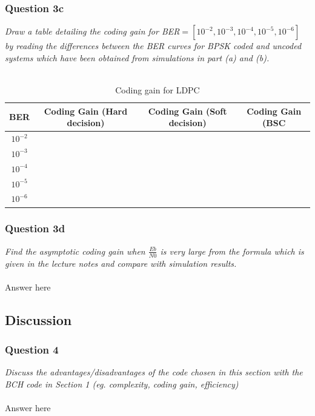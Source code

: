 \documentclass[a4paper]{article}
\begin{document}
\subsubsection{Question 3c} \textit{Draw a table detailing the coding gain for BER$= [10^{-2}, 10^{-3}, 10^{-4} , 10^{-5} , 10^{-6} ]$ by reading the differences between the BER curves for BPSK coded and uncoded systems which have been obtained from simulations in part (a) and (b).}\\
\\

\begin{table}[H]
\centering
\begin{tabular}{| c | c | c | c |}
\hline
BER &  Coding Gain (Hard decision) & Coding Gain (Soft decision)  & Coding Gain (BSC\\
\hline
$10^{-2}$ & & & \\
\hline
$10^{-3}$ & & & \\
\hline
$10^{-4}$ & & & \\
\hline
$10^{-5}$ & & & \\
\hline
$10^{-6}$ & & & \\
\hline
\end{tabular}
\caption{Coding gain for LDPC}
\end{table}

\subsubsection{Question 3d} \textit{Find the asymptotic coding gain when $\frac{Eb}{N0}$ is very large from the formula which is given in the lecture notes and compare with simulation results.} \\
\\
Answer here \\

\subsection{Discussion}

\subsubsection{Question 4} \textit{Discuss the advantages/disadvantages of the code chosen in this section with the BCH code in Section 1 (eg. complexity, coding gain, efficiency)}\\
\\
Answer here \\



\end{document}
